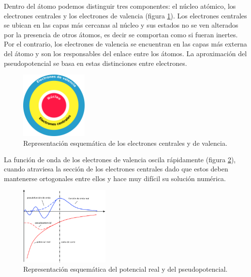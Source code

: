 Dentro del \'atomo podemos distinguir tres componentes: el n\'ucleo at\'omico, los electrones centrales 
y los electrones de valencia (figura \ref{ElectronSeparation}). Los electrones centrales se ubican en las 
capas m\'as cercanas al n\'ucleo  y sus estados  no se ven alterados por la presencia de otros \'atomos, 
es decir se comportan como si fueran inertes. Por el contrario, los electrones de valencia se encuentran 
en las capas m\'as externa del \'atomo y son los responsables del enlace entre los \'atomos. La 
aproximaci\'on del pseudopotencial se basa en estas distinciones entre electrones.

\begin{figure}[H]
    \centering
    \includegraphics[width=0.3\textwidth]{contenido/calculos_computacionales/pseudopotencial/img_pseudopotencial/electrons_separation.png}
    \caption[Representaci\'on esquem\'atica de los electrones 
    centrales y de 
    valencia]{Representaci\'on esquem\'atica de los electrones 
    centrales y de 
    valencia.}
    \label{ElectronSeparation}
\end{figure}

\noindent La funci\'on de onda de los electrones de valencia oscila 
r\'apidamente (figura 
\ref{pseudopotential}), cuando 
atraviesa la secci\'on de los electrones centrales dado que estos 
deben 
mantenerse ortogonales entre ellos y hace muy dif\'icil su soluci\'on 
num\'erica. 

\begin{figure}[H]
    \centering
    \includegraphics[width=0.4\textwidth]{contenido/calculos_computacionales/pseudopotencial/img_pseudopotencial/pseudopotential.png}
    \caption[Representaci\'on esquem\'atica del potencial real y del 
    pseudopotencial]{Representaci\'on esquem\'atica del potencial real y del 
    pseudopotencial.}
    \label{pseudopotential}
\end{figure}

